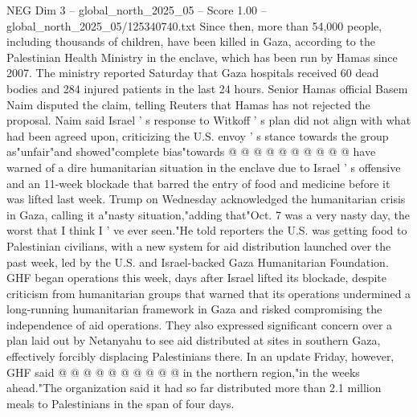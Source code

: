 \begin{textsample}{NEG Dim 3 – global\_north\_2025\_05 – Score 1.00 – global\_north\_2025\_05/125340740.txt}
Since then, more than 54,000 people, including thousands of children, have been killed in Gaza, according to the Palestinian Health Ministry in the enclave, which has been run by Hamas since 2007.
The ministry reported Saturday that Gaza hospitals received 60 dead bodies and 284 injured patients in the last 24 hours.
Senior Hamas official Basem Naim disputed the claim, telling Reuters that Hamas has not rejected the proposal.
Naim said Israel ' s response to Witkoff ' s plan did not align with what had been agreed upon, criticizing the U.S. envoy ' s stance towards the group as"unfair"and showed"complete bias"towards @ @ @ @ @ @ @ @ @ @ have warned of a dire humanitarian situation in the enclave due to Israel ' s offensive and an 11-week blockade that barred the entry of food and medicine before it was lifted last week.
Trump on Wednesday acknowledged the humanitarian crisis in Gaza, calling it a"nasty situation,"adding that"Oct. 7 was a very nasty day, the worst that I think I ' ve ever seen."He told reporters the U.S. was getting food to Palestinian civilians, with a new system for aid distribution launched over the past week, led by the U.S. and Israel-backed Gaza Humanitarian Foundation.
GHF began operations this week, days after Israel lifted its blockade, despite criticism from humanitarian groups that warned that its operations undermined a long-running humanitarian framework in Gaza and risked compromising the independence of aid operations.
They also expressed significant concern over a plan laid out by Netanyahu to see aid distributed at sites in southern Gaza, effectively forcibly displacing Palestinians there.
In an update Friday, however, GHF said @ @ @ @ @ @ @ @ @ @ in the northern region,"in the weeks ahead."The organization said it had so far distributed more than 2.1 million meals to Palestinians in the span of four days.

\end{textsample}
